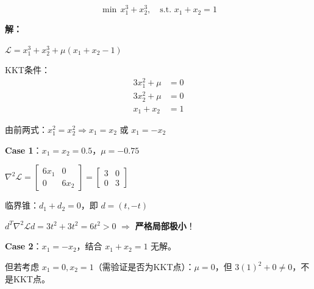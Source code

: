 \begin{example}[多个KKT点的判断]
\[
\min \, x_1^3 + x_2^3, \quad \text{s.t. } x_1 + x_2 = 1
\]

\textbf{解：}

$\mathcal{L} = x_1^3 + x_2^3 + \mu(x_1 + x_2 - 1)$

KKT条件：
\begin{align*}
3x_1^2 + \mu &= 0 \\
3x_2^2 + \mu &= 0 \\
x_1 + x_2 &= 1
\end{align*}

由前两式：$x_1^2 = x_2^2 \Rightarrow x_1 = x_2$ 或 $x_1 = -x_2$

\textbf{Case 1}：$x_1 = x_2 = 0.5$，$\mu = -0.75$

$\nabla^2 \mathcal{L} = \begin{bmatrix} 6x_1 & 0 \\ 0 & 6x_2 \end{bmatrix} = \begin{bmatrix} 3 & 0 \\ 0 & 3 \end{bmatrix}$

临界锥：$d_1 + d_2 = 0$，即 $d = (t, -t)$

$d^T \nabla^2 \mathcal{L} d = 3t^2 + 3t^2 = 6t^2 > 0$ $\Rightarrow$ \textbf{严格局部极小}！

\textbf{Case 2}：$x_1 = -x_2$，结合 $x_1 + x_2 = 1$ 无解。

但若考虑 $x_1 = 0, x_2 = 1$（需验证是否为KKT点）：$\mu = 0$，但 $3(1)^2 + 0 \neq 0$，不是KKT点。
\end{example}

